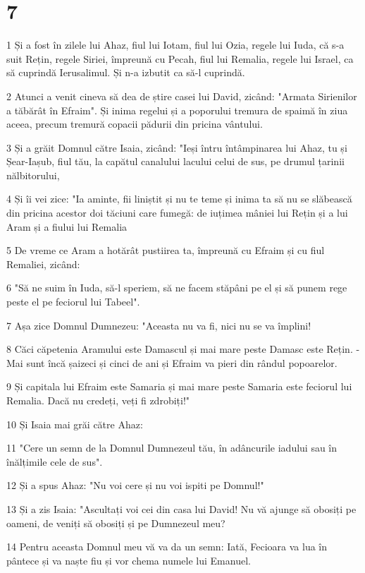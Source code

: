 \chapter{7}

\par 1 Și a fost în zilele lui Ahaz, fiul lui Iotam, fiul lui Ozia, regele lui Iuda, că s-a suit Rețin, regele Siriei, împreună cu Pecah, fiul lui Remalia, regele lui Israel, ca să cuprindă Ierusalimul. Și n-a izbutit ca să-l cuprindă.
\par 2 Atunci a venit cineva să dea de știre casei lui David, zicând: "Armata Sirienilor a tăbărât în Efraim". Și inima regelui și a poporului tremura de spaimă în ziua aceea, precum tremură copacii pădurii din pricina vântului.
\par 3 Și a grăit Domnul către Isaia, zicând: "Ieși întru întâmpinarea lui Ahaz, tu și Șear-Iașub, fiul tău, la capătul canalului lacului celui de sus, pe drumul țarinii nălbitorului,
\par 4 Și îi vei zice: "Ia aminte, fii liniștit și nu te teme și inima ta să nu se slăbească din pricina acestor doi tăciuni care fumegă: de iuțimea mâniei lui Rețin și a lui Aram și a fiului lui Remalia
\par 5 De vreme ce Aram a hotărât pustiirea ta, împreună cu Efraim și cu fiul Remaliei, zicând:
\par 6 "Să ne suim în Iuda, să-l speriem, să ne facem stăpâni pe el și să punem rege peste el pe feciorul lui Tabeel".
\par 7 Așa zice Domnul Dumnezeu: "Aceasta nu va fi, nici nu se va împlini!
\par 8 Căci căpetenia Aramului este Damascul și mai mare peste Damasc este Rețin. - Mai sunt încă șaizeci și cinci de ani și Efraim va pieri din rândul popoarelor.
\par 9 Și capitala lui Efraim este Samaria și mai mare peste Samaria este feciorul lui Remalia. Dacă nu credeți, veți fi zdrobiți!"
\par 10 Și Isaia mai grăi către Ahaz:
\par 11 "Cere un semn de la Domnul Dumnezeul tău, în adâncurile iadului sau în înălțimile cele de sus".
\par 12 Și a spus Ahaz: "Nu voi cere și nu voi ispiti pe Domnul!"
\par 13 Și a zis Isaia: "Ascultați voi cei din casa lui David! Nu vă ajunge să obosiți pe oameni, de veniți să obosiți și pe Dumnezeul meu?
\par 14 Pentru aceasta Domnul meu vă va da un semn: Iată, Fecioara va lua în pântece și va naște fiu și vor chema numele lui Emanuel.
